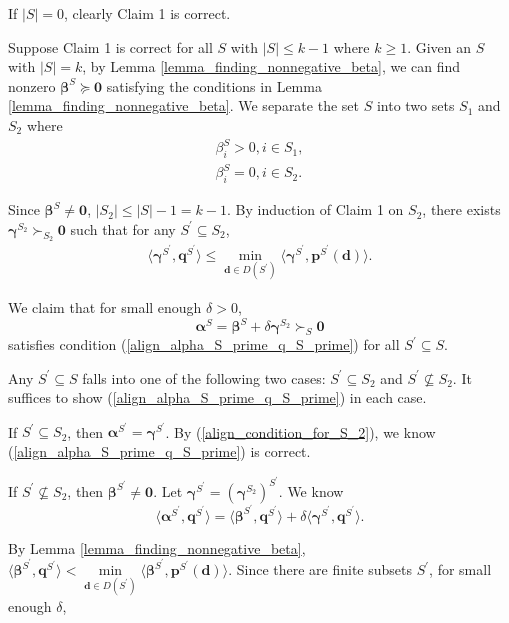\documentclass[prodmode,acmtompecs]{acmsmall}
\newcommand{\succS}[1]{\succ_{#1}}
\begin{document}
If $|S| = 0$, clearly Claim 1 is correct. 

Suppose Claim 1 is correct for all $S$ with $|S| \leq k-1$ where $k \geq 1$. Given an $S$ with $|S| = k$, by Lemma \ref{lemma_finding_nonnegative_beta}, we can find nonzero $\boldsymbol{\beta}^S \succeq \mathbf{0}$ satisfying the conditions in Lemma \ref{lemma_finding_nonnegative_beta}. We separate the set $S$ into two sets $S_1$ and $S_2$ where
\begin{align*}
\beta_i^S > 0, i\in S_1,	\\
\beta_i^S = 0, i\in S_2. 
\end{align*}

Since $\boldsymbol{\beta}^S \neq \mathbf{0}$, $|S_2| \leq |S|-1 = k-1$. By induction of Claim 1 on $S_2$, there exists $\boldsymbol{\gamma}^{S_2} \succS{S_2} \mathbf{0}$ such that for any $S^\prime \subseteq S_2$, 
\begin{align}
\label{align_condition_for_S_2}
\langle \boldsymbol{\gamma}^{S^\prime}, \mathbf{q}^{S^\prime} \rangle \leq 
\min\limits_{\mathbf{d} \in D(S^\prime)} \langle \boldsymbol{\gamma}^{S^\prime}, \mathbf{p}^{S^\prime}(\mathbf{d}) \rangle. 
\end{align}

We claim that for small enough $\delta > 0$, 
$$
\boldsymbol{\alpha}^S = \boldsymbol{\beta}^S + \delta \boldsymbol{\gamma}^{S_2} \succS{S} \mathbf{0}
$$
satisfies condition (\ref{align_alpha_S_prime_q_S_prime}) for all $S^\prime \subseteq S$. 

Any $S^\prime \subseteq S$ falls into one of the following two cases: $S^\prime \subseteq S_2$ and $S^\prime \not\subseteq S_2$. It suffices to show (\ref{align_alpha_S_prime_q_S_prime}) in each case. 

If $S^\prime \subseteq S_2$, then $\boldsymbol{\alpha}^{S^\prime} = \boldsymbol{\gamma}^{S^\prime}$. By (\ref{align_condition_for_S_2}), we know (\ref{align_alpha_S_prime_q_S_prime}) is correct. 

If $S^\prime \not\subseteq S_2$, then $\boldsymbol{\beta}^{S^\prime} \neq \mathbf{0}$. Let $\boldsymbol{\gamma}^{S^\prime} = ({\boldsymbol{\gamma}^{S_2}})^{S^\prime}$. We know
$$
\langle \boldsymbol{\alpha}^{S^\prime}, \mathbf{q}^{S^\prime} \rangle = \langle \boldsymbol{\beta}^{S^\prime}, \mathbf{q}^{S^\prime} \rangle + \delta \langle \boldsymbol{\gamma}^{S^\prime}, \mathbf{q}^{S^\prime} \rangle. 
$$

By Lemma \ref{lemma_finding_nonnegative_beta}, $\langle \boldsymbol{\beta}^{S^\prime}, \mathbf{q}^{S^\prime} \rangle < \min\limits_{\mathbf{d} \in D(S^\prime)} \langle \boldsymbol{\beta}^{S^\prime},  \mathbf{p}^{S^\prime}(\mathbf{d}) \rangle$. Since there are finite subsets $S^\prime$, for small enough $\delta$, 
\end{document}
